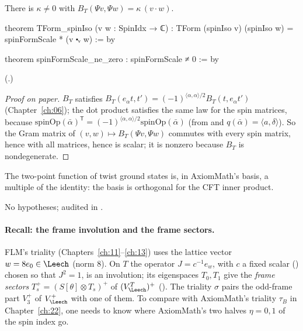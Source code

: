 \begin{theorem}\label{ch21:thm:TForm}
There is $\kappa\ne0$ with $B_T(\Psi v,\Psi w)=\kappa\,(v\cdot w)$.
\end{theorem}
\begin{leancode}
theorem TForm_spinIso (v w : SpinIdx → ℂ) :
    TForm (spinIso v) (spinIso w) = spinFormScale * (v ⬝ᵥ w) := by
\end{leancode}
\begin{leancode}
theorem spinFormScale_ne_zero : spinFormScale ≠ 0 := by
\end{leancode}
(.)
\begin{proof}[Proof on paper]
$B_T$ satisfies $B_T(e_\alpha t,t')=(-1)^{\langle\alpha,\alpha\rangle/2}B_T(t,e_\alpha t')$ (Chapter~\ref{ch:06}); the
dot product satisfies the same law for the spin matrices, because
$\mathrm{spinOp}(\bar\alpha)^{\mathsf T}=(-1)^{\langle\alpha,\alpha\rangle/2}\mathrm{spinOp}(\bar\alpha)$
(from  and $q(\bar\alpha)=\langle a,\delta\rangle$).  So the Gram matrix of
$(v,w)\mapsto B_T(\Psi v,\Psi w)$ commutes with every spin matrix, hence with all matrices, hence is
scalar; it is nonzero because $B_T$ is nondegenerate.
\end{proof}
\begin{physics}
The two-point function of twist ground states is, in AxiomMath's basis, a multiple of the identity:
the basis is orthogonal for the CFT inner product.
\end{physics}
\begin{status}
No hypotheses; audited in .
\end{status}

\paragraph{Recall: the frame involution and the frame sectors.}  FLM's triality
(Chapters~\ref{ch:11}--\ref{ch:13}) uses the lattice vector $w=8e_0\in\Leech$ (norm $8$).  On $T$ the
operator $J=c^{-1}e_w$, with $c$ a fixed scalar () chosen so that $J^2=1$,
is an involution; its eigenspaces $T_0,T_1$ give the \emph{frame sectors} $T_s^+=(S[\theta]\otimes T_s)^+$ of
$(V_\Leech^T)^+$ ().  The triality $\sigma$ pairs the odd-frame part $V_3^+$ of $V_\Leech^+$ with
one of them.  To compare with AxiomMath's triality $\tau_B$ in Chapter~\ref{ch:22}, one needs to know
where AxiomMath's two halves $\eta=0,1$ of the spin index go.

